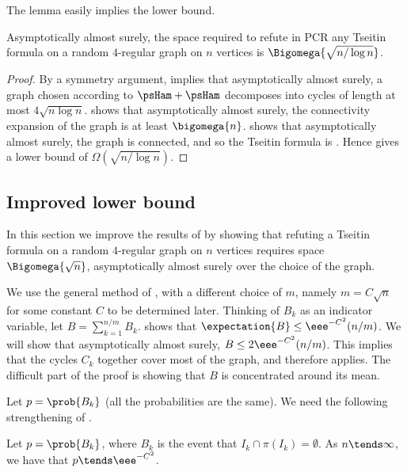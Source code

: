 \documentclass{toc}
\begin{document}
The lemma easily implies the lower bound.

\begin{theorem} \label{thm:simple}
 Asymptotically almost surely, the space required to refute in PCR any Tseitin formula on a random $4$-regular graph on $n$ vertices is $\Bigomega{\sqrt{n/\log n}}$.
\end{theorem}
\begin{proof}
 By a symmetry argument,  implies that asymptotically almost surely, a graph chosen according to $\psHam + \psHam$ decomposes into cycles of %
 length at most $4\sqrt{n \log n}$.  shows that asymptotically almost surely, the connectivity expansion of the graph is at least $\bigomega{n}$.  shows that asymptotically almost surely, the graph is connected, and so the Tseitin formula is \Gnonsplittingnot. Hence  gives a lower bound of $\Omega(\sqrt{n/\log n})$.
\end{proof}

\subsection{Improved lower bound} \label{sec:improved}

In this section we improve the results of  by showing that refuting a \Gnonsplitting Tseitin formula on a random $4$-regular graph on $n$ vertices requires space $\Bigomega{\sqrt{n}}$, asymptotically almost surely over the choice of the graph.

We use the general method of , with a different choice of $m$, namely $m = C\sqrt{n}$ for some constant $C$ to be determined later. Thinking of $B_k$ as an indicator variable, let $B = \sum_{k=1}^{n/m} B_k$.  shows that $\expectation{B} \leq \eee^{-C^2} (n/m)$. We will show that asymptotically almost surely, $B \leq 2\eee^{-C^2} (n/m)$. This implies that the cycles $C_k$ together cover most of the graph, and therefore  applies. The difficult part of the proof is showing that $B$ is concentrated around its mean.

Let $p = \prob{B_k}$ (all the probabilities are the same). We need the following strengthening of .

\begin{lemma} \label{lem:b-prob-limit}
 Let $p = \prob{B_k}$, where $B_k$ is the event that $I_k \cap \pi(I_k) = \emptyset$. As $n \tends \infty$, we have that $p \tends \eee^{-C^2}$.
\end{lemma}
\end{document}
